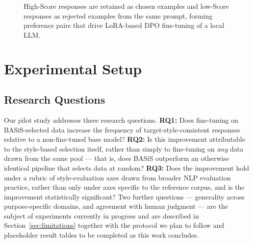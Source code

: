 \documentclass[manuscript,review,anonymous]{acmart}
\begin{document}
\begin{figure}[t]
  \centering
  \caption{High-Score responses are retained as chosen examples and low-Score responses as rejected examples from the same prompt, forming preference pairs that drive LoRA-based DPO fine-tuning of a local LLM.}
  \label{fig:selection}
\end{figure}


\section{Experimental Setup}
\label{sec:setup}

\subsection{Research Questions}
Our pilot study addresses three research questions. \textbf{RQ1:} Does fine-tuning on BASiS-selected data increase the frequency of target-style-consistent responses relative to a non-fine-tuned base model? \textbf{RQ2:} Is this improvement attributable to the style-based selection itself, rather than simply to fine-tuning on \emph{any} data drawn from the same pool --- that is, does BASiS outperform an otherwise identical pipeline that selects data at random? \textbf{RQ3:} Does the improvement hold under a rubric of style-evaluation axes drawn from broader NLP evaluation practice, rather than only under axes specific to the reference corpus, and is the improvement statistically significant? Two further questions --- generality across purpose-specific domains, and agreement with human judgment --- are the subject of experiments currently in progress and are described in Section~\ref{sec:limitations} together with the protocol we plan to follow and placeholder result tables to be completed as this work concludes.
\end{document}
